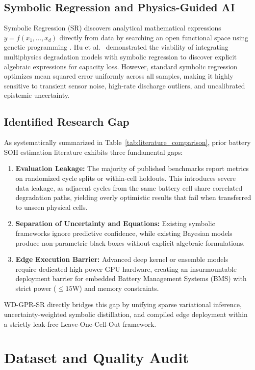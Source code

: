 \documentclass[a4paper,fleqn]{cas-sc}
\begin{document}
\subsection{Symbolic Regression and Physics-Guided AI}
Symbolic Regression (SR) discovers analytical mathematical expressions $y = f(x_1, \dots, x_d)$ directly from data by searching an open functional space using genetic programming \cite{cranmer2023pysr}. Hu et al.~\cite{hu2026multiphysics} demonstrated the viability of integrating multiphysics degradation models with symbolic regression to discover explicit algebraic expressions for capacity loss. However, standard symbolic regression optimizes mean squared error uniformly across all samples, making it highly sensitive to transient sensor noise, high-rate discharge outliers, and uncalibrated epistemic uncertainty.

\subsection{Identified Research Gap}
As systematically summarized in Table~\ref{tab:literature_comparison}, prior battery SOH estimation literature exhibits three fundamental gaps:
\begin{enumerate}
    \item \textbf{Evaluation Leakage:} The majority of published benchmarks report metrics on randomized cycle splits or within-cell holdouts. This introduces severe data leakage, as adjacent cycles from the same battery cell share correlated degradation paths, yielding overly optimistic results that fail when transferred to unseen physical cells.
    \item \textbf{Separation of Uncertainty and Equations:} Existing symbolic frameworks ignore predictive confidence, while existing Bayesian models produce non-parametric black boxes without explicit algebraic formulations.
    \item \textbf{Edge Execution Barrier:} Advanced deep kernel or ensemble models require dedicated high-power GPU hardware, creating an insurmountable deployment barrier for embedded Battery Management Systems (BMS) with strict power ($\le 15$W) and memory constraints.
\end{enumerate}
WD-GPR-SR directly bridges this gap by unifying sparse variational inference, uncertainty-weighted symbolic distillation, and compiled edge deployment within a strictly leak-free Leave-One-Cell-Out framework.

\section{Dataset and Quality Audit}
\end{document}
